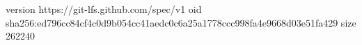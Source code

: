 version https://git-lfs.github.com/spec/v1
oid sha256:ed796cc84cf4c0d9b054cc41aedc0c6a25a1778ccc998fa4e9668d03e51fa429
size 262240
